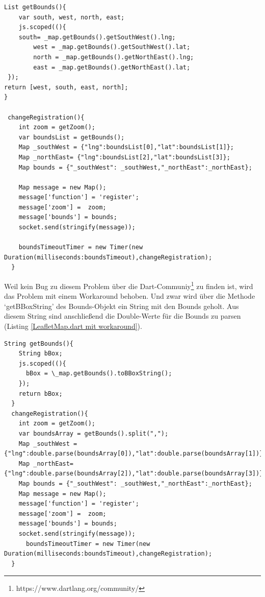\begin{lstlisting}[caption= LeafletMap.dart mit ursprünglicher Abfrage des Bounds-Objektes, label= LeafletMap.dart]
  List getBounds(){
    var south, west, north, east;
    js.scoped((){
    south= _map.getBounds().getSouthWest().lng;
        west = _map.getBounds().getSouthWest().lat;
        north = _map.getBounds().getNorthEast().lng;
        east = _map.getBounds().getNorthEast().lat;
 });
return [west, south, east, north];
}

 changeRegistration(){
    int zoom = getZoom();
    var boundsList = getBounds();
    Map _southWest = {"lng":boundsList[0],"lat":boundsList[1]};
    Map _northEast= {"lng":boundsList[2],"lat":boundsList[3]};
    Map bounds = {"_southWest": _southWest,"_northEast":_northEast};

    Map message = new Map();
    message['function'] = 'register';
    message['zoom'] =  zoom;
    message['bounds'] = bounds;
    socket.send(stringify(message));
    
    boundsTimeoutTimer = new Timer(new Duration(milliseconds:boundsTimeout),changeRegistration);  
  }
\end{lstlisting}
Weil kein Bug zu diesem Problem über die Dart-Communiy\footnote{https://www.dartlang.org/community/} zu finden ist, wird das Problem mit einem Workaround behoben. Und zwar wird über die Methode ‘getBBoxString’ des Bounds-Objekt ein String mit den Bounds geholt. Aus diesem String sind anschließend die Double-Werte für die Bounds zu parsen (Listing \ref{LeafletMap.dart mit workaround}).\\

\begin{lstlisting}[caption= LeafletMap.dart mit workaround über BBoxString, label= LeafletMap.dart mit workaround]
String getBounds(){
    String bBox;
    js.scoped((){
      bBox = \_map.getBounds().toBBoxString();
    });
    return bBox;
  }
  changeRegistration(){
    int zoom = getZoom();
    var boundsArray = getBounds().split(",");
    Map _southWest = {"lng":double.parse(boundsArray[0]),"lat":double.parse(boundsArray[1])};
    Map _northEast= {"lng":double.parse(boundsArray[2]),"lat":double.parse(boundsArray[3])};
    Map bounds = {"_southWest": _southWest,"_northEast":_northEast};
    Map message = new Map();
    message['function'] = 'register';
    message['zoom'] =  zoom;
    message['bounds'] = bounds;
    socket.send(stringify(message));
      boundsTimeoutTimer = new Timer(new Duration(milliseconds:boundsTimeout),changeRegistration);  
  }
\end{lstlisting}

